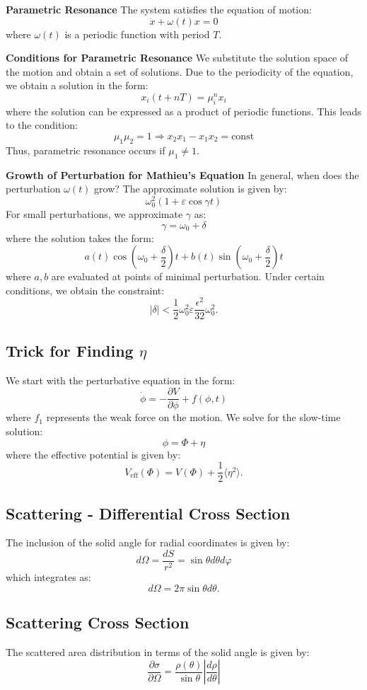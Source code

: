 \textbf{Parametric Resonance}
The system satisfies the equation of motion:
\[
\ddot{x} + \omega (t) x = 0
\]
where $\omega (t)$ is a periodic function with period $T$.

\textbf{Conditions for Parametric Resonance}
We substitute the solution space of the motion and obtain a set of solutions. Due to the periodicity of the equation, we obtain a solution in the form:
\[
x_i (t + nT) = \mu_i^n x_i
\]
where the solution can be expressed as a product of periodic functions. This leads to the condition:
\[
\mu_1 \mu_2 = 1 \Rightarrow x_2 x_1 - x_1 x_2 = \text{const}
\]
Thus, parametric resonance occurs if $\mu_1 \neq 1$.

\textbf{Growth of Perturbation for Mathieu's Equation}
In general, when does the perturbation $\omega (t)$ grow?  
The approximate solution is given by:
\[
\omega_0^2 (1 + \varepsilon \cos \gamma t)
\]
For small perturbations, we approximate $\gamma$ as:
\[
\gamma = \omega_0 + \delta
\]
where the solution takes the form:
\[
a(t) \cos \left(\omega_0 + \frac{\delta}{2} \right)t + b(t) \sin \left(\omega_0 + \frac{\delta}{2} \right)t
\]
where $a, b$ are evaluated at points of minimal perturbation. Under certain conditions, we obtain the constraint:
\[
|\delta| < \frac{1}{2} \omega_0^2 \varepsilon \frac{\epsilon^2}{32} \omega_0^2.
\]

\subsection*{Trick for Finding $\eta$}
We start with the perturbative equation in the form:
\[
\dot{\phi} = -\frac{\partial V}{\partial \phi} + f (\phi, t)
\]
where $f_1$ represents the weak force on the motion. We solve for the slow-time solution:
\[
\phi = \Phi + \eta
\]
where the effective potential is given by:
\[
V_{\text{eff}} (\Phi) = V (\Phi) + \frac{1}{2} \langle \eta^2 \rangle.
\]

\subsection*{Scattering - Differential Cross Section}
The inclusion of the solid angle for radial coordinates is given by:
\[
d\Omega = \frac{dS}{r^2} = \sin \theta d\theta d\varphi
\]
which integrates as:
\[
d\Omega = 2\pi \sin \theta d\theta.
\]

\subsection*{Scattering Cross Section}
The scattered area distribution in terms of the solid angle is given by:
\[
\frac{\partial \sigma}{\partial \Omega} = \frac{\rho (\theta)}{\sin \theta} \left| \frac{d\rho}{d\theta} \right|
\]

